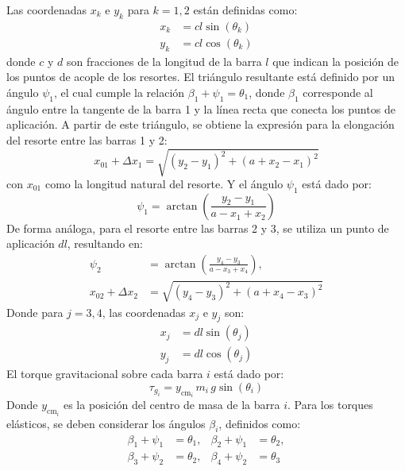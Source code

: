 Las coordenadas $x_k$ e $y_k$ para $k = 1, 2$ est\'an definidas como:
\begin{align}
  x_k &= c l \sin(\theta_{k}) \label{eq:xk} \\
  y_k &= c l \cos(\theta_{k}) \label{eq:yk}
\end{align}
donde $c$ y $d$ son fracciones de la longitud de la barra $l$ que
indican la posici\'on de los puntos de acople de los resortes.
El tri\'angulo resultante est\'a definido por un \'angulo $\psi_1$,
el cual cumple la relaci\'on $\beta_1 + \psi_1 = \theta_1$, donde
$\beta_1$ corresponde al \'angulo entre la tangente de la barra 1 y
la l\'inea recta que conecta los puntos de aplicaci\'on.
A partir de este tri\'angulo, se obtiene la expresi\'on para la
elongaci\'on del resorte entre las barras 1 y 2:
\begin{equation}
  x_{01} + \Delta x_{1} = \sqrt{(y_2 - y_1)^2 + (a + x_2 - x_1)^2}
  \label{eq:elongacion1}
\end{equation}
con $x_{01}$ como la longitud natural del resorte.
Y el \'angulo $\psi_1$ est\'a dado por:
\begin{equation}
  \psi_1 = \arctan\left( \frac{y_2 - y_1}{a - x_1 + x_2} \right)
  \label{eq:psi1}
\end{equation}
De forma an\'aloga, para el resorte entre las barras 2 y 3, se
utiliza un punto de aplicaci\'on $d l$, resultando en:
\begin{align}
  \psi_2 &= \arctan \left( \frac{y_4 - y_3}{a - x_3 + x_4} \right) \label{eq:psi2}, \\
  x_{02} + \Delta x_{2} &= \sqrt{(y_4 - y_3)^2 + (a + x_4 - x_3)^2} \label{eq:elongacion2}
\end{align}
Donde para $j = 3, 4$, las coordenadas $x_j$ e $y_j$ son:
\begin{align}
  x_j &= d l \sin(\theta_{j}) \label{eq:xj} \\
  y_j &= d l \cos(\theta_{j}) \label{eq:yj}
\end{align}
El torque gravitacional sobre cada barra $i$ est\'a dado por:
\begin{equation}
  \tau_{g_i} = y_{\text{cm}_i} \, m_i \, g \sin(\theta_i) \label{eq:tau_g}
\end{equation}
Donde $y_{\text{cm}_i}$ es la posici\'on del centro de masa de la
barra $i$. Para los torques el\'asticos, se deben
considerar los \'angulos $\beta_i$, definidos como:
\begin{align}
  \beta_1 + \psi_1 &= \theta_1, & \beta_2 + \psi_1 &= \theta_2, \label{eq:beta1_psi1}\\
  \beta_3 + \psi_2 &= \theta_2, & \beta_4 + \psi_2 &= \theta_3 \label{eq:beta3_psi2}
\end{align}
